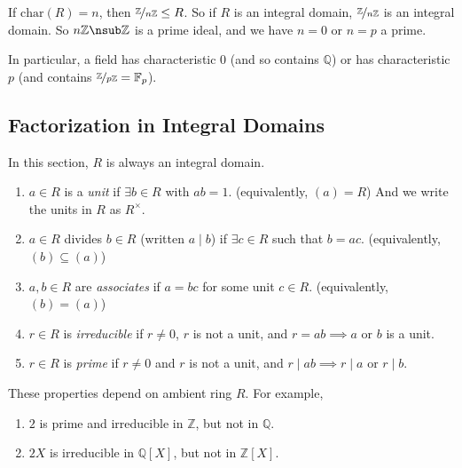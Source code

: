 \begin{remark}
    If \(\mathrm{char}(R) = n\), then \(\nicefrac{\mathbb{Z}}{n\mathbb{Z}}\leq R\). So if \(R\) is an integral domain, \(\nicefrac{\mathbb{Z}}{n\mathbb{Z}}\) is an integral domain. So \(n\mathbb{Z} \nsub \mathbb{Z}\) is a prime ideal, and we have \(n = 0\) or \(n = p\) a prime.

    In particular, a field has characteristic \(0\) (and so contains \(\mathbb{Q}\)) or has characteristic \(p\) (and contains \(\nicefrac{\mathbb{Z}}{p\mathbb{Z}} = \mathbb{F}_p\)).
\end{remark}
\subsection{Factorization in Integral Domains}
In this section, \(R\) is always an integral domain.
\begin{definition}
    \leavevmode
    \begin{enumerate}
        \item \(a \in R\) is a \textit{unit} if \(\exists b\in R\) with \(ab = 1\). (equivalently, \((a) = R\)) And we write the units in \(R\) as \(R^\times \).
        \item \(a \in R\) divides \(b \in R\) (written \(a \mid b\)) if \(\exists c \in R\) such that \(b = ac\). (equivalently, \((b) \subseteq (a)\))
        \item \(a,b \in R\) are \textit{associates}  if \(a = bc\) for some unit \(c \in R\). (equivalently, \((b) = (a)\))
        \item \(r \in R\) is \textit{irreducible} if \(r\neq 0\), \(r\) is not a unit, and \(r = ab \implies a\) or \(b\) is a unit.
        \item \(r \in R\) is \textit{prime}  if \(r \neq 0\) and \(r\) is not a unit, and \(r\mid ab \implies r \mid a\) or \(r\mid b\).
    \end{enumerate}
\end{definition}
\begin{note}
    These properties depend on ambient ring \(R\). For example,
    \begin{enumerate}
    \item \(2\) is prime and irreducible in \(\mathbb{Z}\), but not in \(\mathbb{Q}\).
    \item \(2X\) is irreducible in \(\mathbb{Q}[X]\), but not in \(\mathbb{Z}[X]\).
    \end{enumerate}
\end{note}
